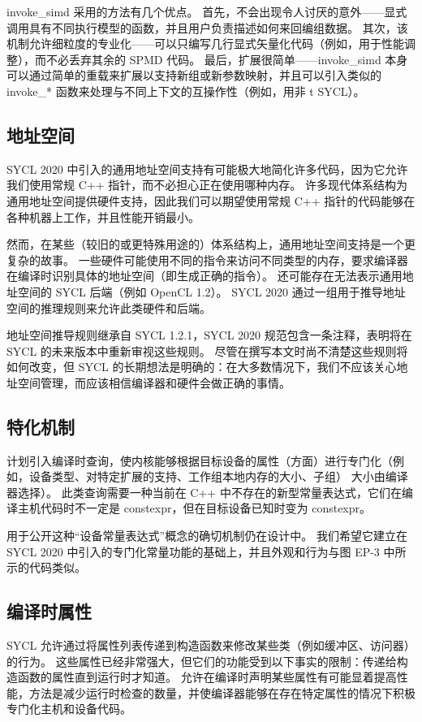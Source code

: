 invoke\_simd 采用的方法有几个优点。 首先，不会出现令人讨厌的意外——显式调用具有不同执行模型的函数，并且用户负责描述如何来回编组数据。 其次，该机制允许细粒度的专业化——可以只编写几行显式矢量化代码（例如，用于性能调整），而不必丢弃其余的 SPMD 代码。 最后，扩展很简单——invoke\_simd 本身可以通过简单的重载来扩展以支持新组或新参数映射，并且可以引入类似的 invoke\_* 函数来处理与不同上下文的互操作性（例如，用非 t SYCL）。

\subsection{地址空间}
SYCL 2020 中引入的通用地址空间支持有可能极大地简化许多代码，因为它允许我们使用常规 C++ 指针，而不必担心正在使用哪种内存。 许多现代体系结构为通用地址空间提供硬件支持，因此我们可以期望使用常规 C++ 指针的代码能够在各种机器上工作，并且性能开销最小。

然而，在某些（较旧的或更特殊用途的）体系结构上，通用地址空间支持是一个更复杂的故事。 一些硬件可能使用不同的指令来访问不同类型的内存，要求编译器在编译时识别具体的地址空间（即生成正确的指令）。 还可能存在无法表示通用地址空间的 SYCL 后端（例如 OpenCL 1.2）。 SYCL 2020 通过一组用于推导地址空间的推理规则来允许此类硬件和后端。

地址空间推导规则继承自 SYCL 1.2.1，SYCL 2020 规范包含一条注释，表明将在 SYCL 的未来版本中重新审视这些规则。 尽管在撰写本文时尚不清楚这些规则将如何改变，但 SYCL 的长期想法是明确的：在大多数情况下，我们不应该关心地址空间管理，而应该相信编译器和硬件会做正确的事情。

\subsection{特化机制}
计划引入编译时查询，使内核能够根据目标设备的属性（方面）进行专门化（例如，设备类型、对特定扩展的支持、工作组本地内存的大小、子组） 大小由编译器选择）。 此类查询需要一种当前在 C++ 中不存在的新型常量表达式，它们在编译主机代码时不一定是 constexpr，但在目标设备已知时变为 constexpr。

用于公开这种“设备常量表达式”概念的确切机制仍在设计中。 我们希望它建立在 SYCL 2020 中引入的专门化常量功能的基础上，并且外观和行为与图 EP-3 中所示的代码类似。

\subsection{编译时属性}
SYCL 允许通过将属性列表传递到构造函数来修改某些类（例如缓冲区、访问器）的行为。 这些属性已经非常强大，但它们的功能受到以下事实的限制：传递给构造函数的属性直到运行时才知道。 允许在编译时声明某些属性有可能显着提高性能，方法是减少运行时检查的数量，并使编译器能够在存在特定属性的情况下积极专门化主机和设备代码。

